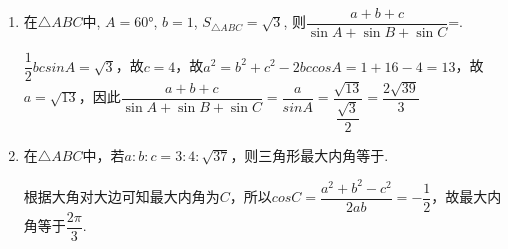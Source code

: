 \begin{enumerate}
        \item 在$\triangle{ABC}$中, $A=\ang{60}$, $b=1$, $S_{\triangle{ABC}}=\sqrt{3}$, 则$\dfrac{a+b+c}{\sin{A}+\sin{B}+\sin{C}}$=. 
        \begin{jieda}
            $\dfrac{1}{2}bcsinA = \sqrt{3}$，故$c = 4$，故$a^2 = b^2+c^2-2bccosA = 1 + 16 - 4 = 13$，故$a = \sqrt{13}$，因此$\dfrac{a+b+c}{\sin{A}+\sin{B}+\sin{C}} = \dfrac{a}{sinA} = \dfrac{\sqrt{13}}{\dfrac{\sqrt{3}}{2}} = \dfrac{2\sqrt{39}}{3}$
        \end{jieda}
        
        \item 在$\triangle ABC$中，若$a : b : c = 3 : 4:\sqrt{37}$，则三角形最大内角等于.
        \begin{jieda}
            根据大角对大边可知最大内角为$C$，所以$cosC = \dfrac{a^2+b^2-c^2}{2ab} = -\dfrac{1}{2}$，故最大内角等于$\dfrac{2\pi}{3}$.
        \end{jieda}
        

\end{enumerate}
